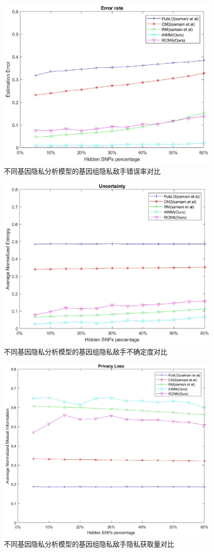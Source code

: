 \begin{figure}[htbp]
	\centering
	\includegraphics[width =0.8\linewidth]{./figures/Fig5-genomic-privacy-quantifying-incorrectness.eps}
	\caption{不同基因隐私分析模型的基因组隐私敌手错误率对比}
	\label{fig:error}
\end{figure}
\begin{figure}[htbp]
	\centering
	\includegraphics[width =0.8\linewidth]{./figures/Fig6-genomic-privacy-quantifying-uncertainty.eps}
	\caption{不同基因隐私分析模型的基因组隐私敌手不确定度对比}
	\label{fig:uncertainty}
\end{figure}
\begin{figure}[htbp]
	\centering
	\includegraphics[width =0.8\linewidth]{./figures/Fig7-genomic-privacy-quantifying-privacyloss.eps}
	\caption{不同基因隐私分析模型的基因组隐私敌手隐私获取量对比}
	\label{fig:privacyloss}
\end{figure}

